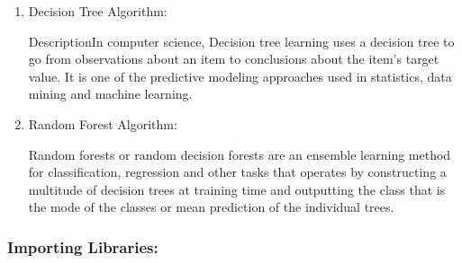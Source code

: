 \documentclass[11pt]{article}
\providecommand{\tightlist}{%
      \setlength{\itemsep}{0pt}\setlength{\parskip}{0pt}}
\begin{document}
\begin{enumerate}
\def\labelenumi{\arabic{enumi}.}
\tightlist
\item
  Decision Tree Algorithm:

  DescriptionIn computer science, Decision tree learning uses a decision
  tree to go from observations about an item to conclusions about the
  item's target value. It is one of the predictive modeling approaches
  used in statistics, data mining and machine learning.
\item
  Random Forest Algorithm:

  Random forests or random decision forests are an ensemble learning
  method for classification, regression and other tasks that operates by
  constructing a multitude of decision trees at training time and
  outputting the class that is the mode of the classes or mean
  prediction of the individual trees.
\end{enumerate}

    \subsubsection{Importing Libraries:}\label{importing-libraries}
\end{document}

